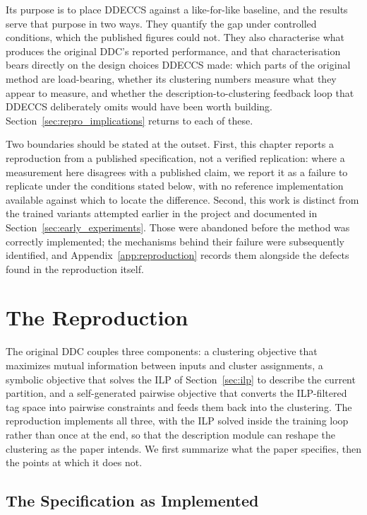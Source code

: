 Its purpose is to place DDECCS against a like-for-like baseline, and the results serve that purpose in two ways. They quantify the gap under controlled conditions, which the published figures could not. They also characterise what produces the original DDC's reported performance, and that characterisation bears directly on the design choices DDECCS made: which parts of the original method are load-bearing, whether its clustering numbers measure what they appear to measure, and whether the description-to-clustering feedback loop that DDECCS deliberately omits would have been worth building. Section~\ref{sec:repro_implications} returns to each of these.

Two boundaries should be stated at the outset. First, this chapter reports a reproduction from a published specification, not a verified replication: where a measurement here disagrees with a published claim, we report it as a failure to replicate under the conditions stated below, with no reference implementation available against which to locate the difference. Second, this work is distinct from the trained variants attempted earlier in the project and documented in Section~\ref{sec:early_experiments}. Those were abandoned before the method was correctly implemented; the mechanisms behind their failure were subsequently identified, and Appendix~\ref{app:reproduction} records them alongside the defects found in the reproduction itself.

\section{The Reproduction}
\label{sec:repro_implementation}

The original DDC couples three components: a clustering objective that maximizes mutual information between inputs and cluster assignments, a symbolic objective that solves the ILP of Section~\ref{sec:ilp} to describe the current partition, and a self-generated pairwise objective that converts the ILP-filtered tag space into pairwise constraints and feeds them back into the clustering. The reproduction implements all three, with the ILP solved inside the training loop rather than once at the end, so that the description module can reshape the clustering as the paper intends. We first summarize what the paper specifies, then the points at which it does not.

\subsection{The Specification as Implemented}
\label{subsec:repro_spec}

